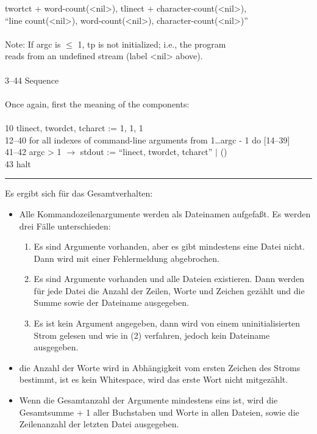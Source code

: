 \begin{tabbing}
	\> \>	twortct + word-count(<nil>), tlinect + character-count(<nil>), \\
	\> \>	``line count(<nil>), word-count(<nil>), character-count(<nil>)''\\
\\
	\> Note: If argc is $\leq$ 1, tp is not initialized; i.e., the program\\
	\> reads from an undefined stream (label <nil> above).\\
\\
3--44	\> Sequence\\
\\
	Once again, first the meaning of the components:\\
\\
10	\> tlinect, twordct, tcharct := 1, 1, 1\\
12--40	\> for all indexes of command-line arguments from 1{\ldots}argc - 1 do [14--39]\\
41--42	\> argc > 1 $\rightarrow$ stdout := ``linect, twordct, tcharct'' $\mid$ ()\\
43	\> halt\\
\rule{\textwidth}{.5pt}
\end{tabbing}

\noindent
Es ergibt sich f\"ur das Gesamtverhalten:

\begin{itemize}

\item Alle Kommandozeilenargumente werden als Dateinamen
aufgefa{\ss}t.  Es werden drei F\"alle unterschieden: 

\begin{enumerate}
\item Es sind Argumente vorhanden, aber es gibt mindestens eine Datei
nicht.  Dann wird mit einer Fehlermeldung abgebrochen.
\item Es sind Argumente vorhanden und alle Dateien existieren. Dann
werden f\"ur jede Datei die Anzahl der Zeilen, Worte und Zeichen
gez\"ahlt und die Summe sowie der Dateiname ausgegeben. 
\item Es ist kein Argument angegeben, dann wird von einem
uninitialisierten Strom gelesen und wie in (2) verfahren,  
jedoch kein Dateiname ausgegeben.
\end{enumerate}

\item die Anzahl der Worte wird in Abh\"angigkeit vom ersten Zeichen
des Stroms bestimmt, ist es kein Whitespace, wird das erste Wort nicht
mitgez\"ahlt. 

\item Wenn die Gesamtanzahl der Argumente mindestens eins ist, wird die
Gesamtsumme + 1 aller Buchstaben und Worte in allen Dateien, sowie die
Zeilenanzahl der letzten Datei ausgegeben.  

\end{itemize}


